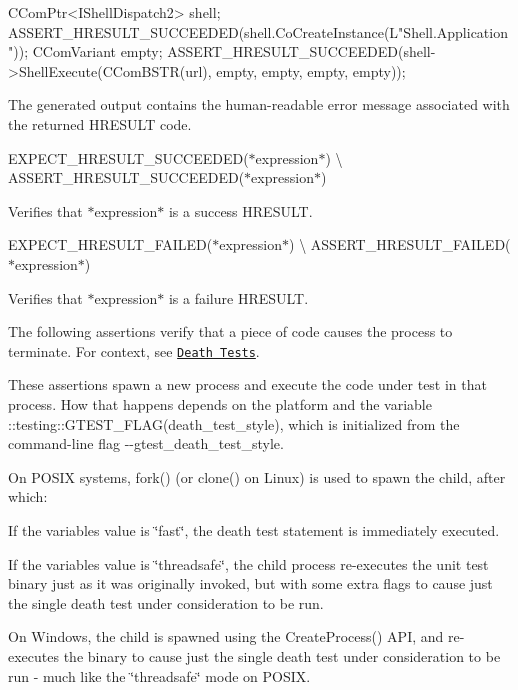 \begin{DoxyCode}
CComPtr<IShellDispatch2> shell;
ASSERT\_HRESULT\_SUCCEEDED(shell.CoCreateInstance(L\textcolor{stringliteral}{"Shell.Application"}));
CComVariant empty;
ASSERT\_HRESULT\_SUCCEEDED(shell->ShellExecute(CComBSTR(url), empty, empty, empty, empty));
\end{DoxyCode}


The generated output contains the human-\/readable error message associated with the returned {\ttfamily H\+R\+E\+S\+U\+LT} code.

{\ttfamily E\+X\+P\+E\+C\+T\+\_\+\+H\+R\+E\+S\+U\+L\+T\+\_\+\+S\+U\+C\+C\+E\+E\+D\+ED(}$\ast${\ttfamily expression}$\ast${\ttfamily )} \textbackslash{} {\ttfamily A\+S\+S\+E\+R\+T\+\_\+\+H\+R\+E\+S\+U\+L\+T\+\_\+\+S\+U\+C\+C\+E\+E\+D\+ED(}$\ast${\ttfamily expression}$\ast${\ttfamily )}

Verifies that $\ast${\ttfamily expression}$\ast$ is a success {\ttfamily H\+R\+E\+S\+U\+LT}.

{\ttfamily E\+X\+P\+E\+C\+T\+\_\+\+H\+R\+E\+S\+U\+L\+T\+\_\+\+F\+A\+I\+L\+ED(}$\ast${\ttfamily expression}$\ast${\ttfamily )} \textbackslash{} {\ttfamily A\+S\+S\+E\+R\+T\+\_\+\+H\+R\+E\+S\+U\+L\+T\+\_\+\+F\+A\+I\+L\+ED(}$\ast${\ttfamily expression}$\ast${\ttfamily )}

Verifies that $\ast${\ttfamily expression}$\ast$ is a failure {\ttfamily H\+R\+E\+S\+U\+LT}.

The following assertions verify that a piece of code causes the process to terminate. For context, see \href{../advanced.md#death-tests}{\tt Death Tests}.

These assertions spawn a new process and execute the code under test in that process. How that happens depends on the platform and the variable {\ttfamily \+::testing\+::\+G\+T\+E\+S\+T\+\_\+\+F\+L\+A\+G(death\+\_\+test\+\_\+style)}, which is initialized from the command-\/line flag {\ttfamily -\/-\/gtest\+\_\+death\+\_\+test\+\_\+style}.


\begin{DoxyItemize}
\item On P\+O\+S\+IX systems, {\ttfamily fork()} (or {\ttfamily clone()} on Linux) is used to spawn the child, after which\+:
\begin{DoxyItemize}
\item If the variable\textquotesingle{}s value is {\ttfamily \char`\"{}fast\char`\"{}}, the death test statement is immediately executed.
\item If the variable\textquotesingle{}s value is {\ttfamily \char`\"{}threadsafe\char`\"{}}, the child process re-\/executes the unit test binary just as it was originally invoked, but with some extra flags to cause just the single death test under consideration to be run.
\end{DoxyItemize}
\item On Windows, the child is spawned using the {\ttfamily Create\+Process()} A\+PI, and re-\/executes the binary to cause just the single death test under consideration to be run -\/ much like the {\ttfamily \char`\"{}threadsafe\char`\"{}} mode on P\+O\+S\+IX.
\end{DoxyItemize}

